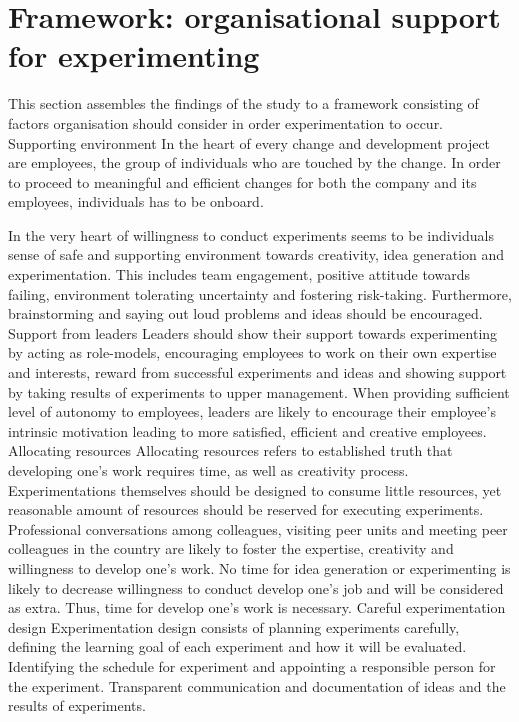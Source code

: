 \section{Framework: organisational support for experimenting} \label{framework}
This section assembles the findings of the study to a framework consisting of factors organisation should consider in order experimentation to occur. 
\newline
\newline
Supporting environment \newline
In the heart of every change and development project are employees, the group of individuals who are touched by the change. In order to proceed to meaningful and efficient changes for both the company and its employees, individuals has to be onboard. 

In the very heart of willingness to conduct experiments seems to be individuals sense of safe and supporting environment towards creativity, idea generation and experimentation. This includes team engagement, positive attitude towards failing, environment tolerating uncertainty and fostering risk-taking. Furthermore, brainstorming and saying out loud problems and ideas should be encouraged. 
\newline
\newline
Support from leaders \newline
Leaders should show their support towards experimenting by acting as role-models, encouraging employees to work on their own expertise and interests, reward from successful experiments and ideas and showing support by taking results of experiments to upper management. When providing sufficient level of autonomy to employees, leaders are likely to encourage their employee's intrinsic motivation leading to more satisfied, efficient and creative employees. 
\newline
\newline
Allocating resources \newline
Allocating resources refers to established truth that developing one's work requires time, as well as creativity process. Experimentations themselves should be designed to consume little resources, yet reasonable amount of resources should be reserved for executing experiments. Professional conversations among colleagues, visiting peer units and meeting peer colleagues in the country are likely to foster the expertise, creativity and willingness to develop one's work. No time for idea generation or experimenting is likely to decrease willingness to conduct develop one's job and will be considered as extra. Thus, time for develop one's work is necessary. 
\newline
\newline
Careful experimentation design \newline
Experimentation design consists of planning experiments carefully, defining the learning goal of each experiment and how it will be evaluated. Identifying the schedule for experiment and appointing a responsible person for the experiment. Transparent communication and documentation of ideas and the results of experiments. 

